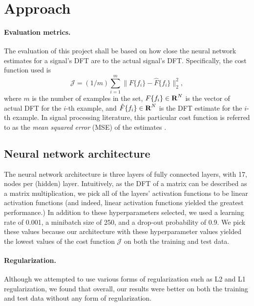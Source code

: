 \documentclass[12pt]{article}
\begin{document}
\section{Approach} \label{s-approach}

\paragraph{Evaluation metrics.}
The evaluation of this project shall be based on how close the neural network estimates for 
a signal's DFT are to the actual signal's DFT. Specifically, the cost function used is
\[
\mathcal J = (1/m) \sum_{i = 1}^{m} \|F\{f_i\} - \hat{F}\{f_i\} \|_2^2,
\]
where $m$ is the number of examples in the set, $F\{f_i\} \in {\mbox{\bf R}}^N$ is the vector of actual DFT 
for the $i$-th example, and $\hat{F}\{f_i\} \in {\mbox{\bf R}}^N$ is the DFT estimate for the $i$-th example. 
In signal processing literature, this particular cost function is referred to as the 
\emph{mean squared error} (MSE) of the estimates \cite{DG:10}.

\subsection{Neural network architecture} The neural network architecture is three layers of 
fully connected layers, with 17, nodes per (hidden) layer. Intuitively, as the DFT of a matrix can be described 
as a matrix multiplication, we pick all of the layers' activation functions to be linear activation 
functions (and indeed, linear activation functions yielded the greatest performance.) In addition to these 
hyperparameters selected, we used a learning rate of 0.001, a minibatch size of 250, and a drop-out 
probability of 0.9. We pick these values because our architecture with these hyperparameter values yielded 
the lowest values of the cost function $\mathcal J$ on both the training and test data.

\paragraph{Regularization.} Although we attempted to use various forms of regularization such as L2 and 
L1 regularization, we found that overall, our results were better on both the training and test data 
without any form of regularization.
\end{document}
